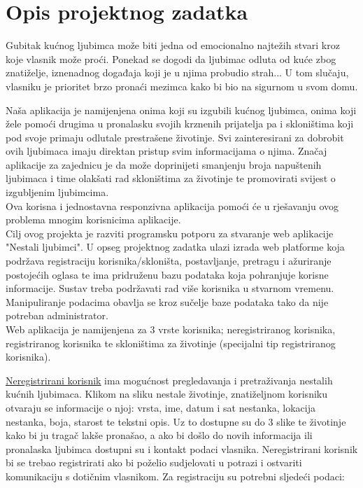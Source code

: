 \chapter{Opis projektnog zadatka}

		Gubitak kućnog ljubimca može biti jedna od emocionalno najtežih stvari kroz koje vlasnik može proći. Ponekad se dogodi da ljubimac odluta od kuće zbog znatiželje, iznenadnog događaja koji je u njima probudio strah... U tom slučaju, vlasniku je prioritet brzo pronaći mezimca kako bi bio na sigurnom u svom domu.
		
		Naša aplikacija je namijenjena onima koji su izgubili kućnog ljubimca, onima koji žele pomoći drugima u pronalasku svojih krznenih prijatelja pa i skloništima koji pod svoje primaju odlutale prestrašene životinje. Svi zainteresirani za dobrobit ovih ljubimaca imaju direktan pristup svim informacijama o njima. Značaj aplikacije za zajednicu je da može doprinijeti smanjenju broja napuštenih ljubimaca i time olakšati rad skloništima za životinje te promovirati svijest o izgubljenim ljubimcima. \\
		
		Ova korisna i jednostavna responzivna aplikacija pomoći će u rješavanju ovog problema mnogim korisnicima aplikacije.\\
		
		Cilj ovog projekta je razviti programsku potporu za stvaranje web aplikacije "Nestali ljubimci". U opseg projektnog zadatka ulazi izrada web platforme koja podržava registraciju korisnika/skloništa, postavljanje, pretragu i ažuriranje postojećih oglasa te ima pridruženu bazu podataka koja pohranjuje korisne informacije. Sustav treba podržavati rad više korisnika u stvarnom vremenu. Manipuliranje podacima obavlja se kroz sučelje baze podataka tako da nije potreban administrator.\\
		
		Web aplikacija je namijenjena za 3 vrste korisnika; neregistriranog korisnika, registriranog korisnika te skloništima za životinje (specijalni tip registriranog korisnika).
		
		\underline{Neregistrirani korisnik} ima mogućnost pregledavanja i pretraživanja nestalih kućnih ljubimaca. Klikom na sliku nestale životinje, znatiželjnom korisniku otvaraju se informacije o njoj: vrsta, ime, datum i sat nestanka, lokacija nestanka, boja, starost te tekstni opis. Uz to dostupne su do 3 slike te životinje kako bi ju tragač lakše pronašao, a ako bi došlo do novih informacija ili pronalaska ljubimca dostupni su i kontakt podaci vlasnika. Neregistrirani korisnik bi se trebao registrirati ako bi poželio sudjelovati u potrazi i ostvariti komunikaciju s dotičnim vlasnikom. Za registraciju su potrebni sljedeći podaci:
		

